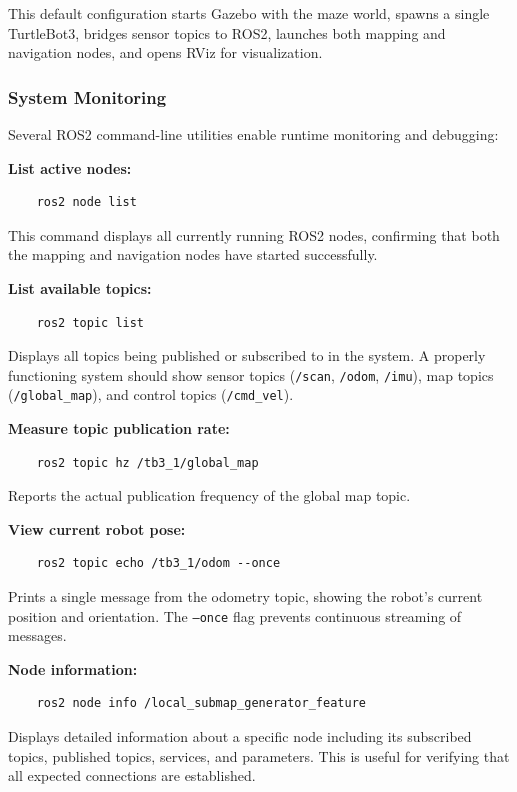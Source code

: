 \documentclass[11pt]{article}
\begin{document}
This default configuration starts Gazebo with the maze world, spawns a single TurtleBot3, bridges sensor topics to ROS2, launches both mapping and navigation nodes, and opens RViz for visualization.

\subsubsection{System Monitoring}

Several ROS2 command-line utilities enable runtime monitoring and debugging:

\textbf{List active nodes:}
\begin{verbatim}
	ros2 node list
\end{verbatim}

This command displays all currently running ROS2 nodes, confirming that both the mapping and navigation nodes have started successfully.

\textbf{List available topics:}
\begin{verbatim}
	ros2 topic list
\end{verbatim}

Displays all topics being published or subscribed to in the system. A properly functioning system should show sensor topics (\texttt{/scan}, \texttt{/odom}, \texttt{/imu}), map topics (\texttt{/global\_map}), and control topics (\texttt{/cmd\_vel}).

\textbf{Measure topic publication rate:}
\begin{verbatim}
	ros2 topic hz /tb3_1/global_map
\end{verbatim}

Reports the actual publication frequency of the global map topic. 

\textbf{View current robot pose:}
\begin{verbatim}
	ros2 topic echo /tb3_1/odom --once
\end{verbatim}

Prints a single message from the odometry topic, showing the robot's current position and orientation. The \texttt{--once} flag prevents continuous streaming of messages.

\textbf{Node information:}
\begin{verbatim}
	ros2 node info /local_submap_generator_feature
\end{verbatim}

Displays detailed information about a specific node including its subscribed topics, published topics, services, and parameters. This is useful for verifying that all expected connections are established.
\end{document}

